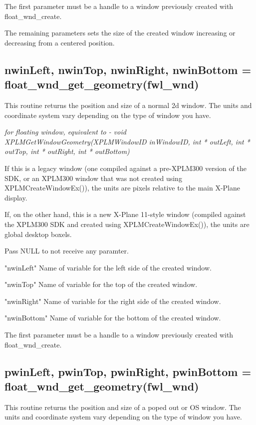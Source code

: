 \documentclass[11pt,parskip=half,a4paper]{scrartcl}
\begin{document}
The first parameter must be a handle to a window previously created with float\_wnd\_create.

The remaining parameters sets the size of the created window increasing or decreasing from a centered position.
 
\newpage

\subsection{\hspace*{1.0mm}nwinLeft, nwinTop, nwinRight, nwinBottom = float\_wnd\_get\_geometry(fwl\_wnd)}

This routine returns the position and size of a normal 2d window. The units and coordinate system vary depending on the type of window you have.

\emph{for floating window, equivalent to - void XPLMGetWindowGeometry(XPLMWindowID inWindowID, int * outLeft, int * outTop, int * outRight, int * outBottom)}

If this is a legacy window (one compiled against a pre-XPLM300 version of the SDK, or an XPLM300 window that was not created using XPLMCreateWindowEx()), the units are pixels relative to the main X-Plane display.

If, on the other hand, this is a new X-Plane 11-style window (compiled against the XPLM300 SDK and created using XPLMCreateWindowEx()), the units are global desktop boxels.

Pass NULL to not receive any paramter.

"nwinLeft" Name of variable for the left side of the created window.

"nwinTop" Name of variable for the top of the created window.

"nwinRight" Name of variable for the right side of the created window.

"nwinBottom" Name of variable for the bottom of the created window.

The first parameter must be a handle to a window previously created with float\_wnd\_create.

\newpage

\subsection{\hspace*{1.0mm}pwinLeft, pwinTop, pwinRight, pwinBottom = float\_wnd\_get\_geometry(fwl\_wnd)}

This routine returns the position and size of a poped out or OS window. The units and coordinate system vary depending on the type of window you have.
\end{document}
